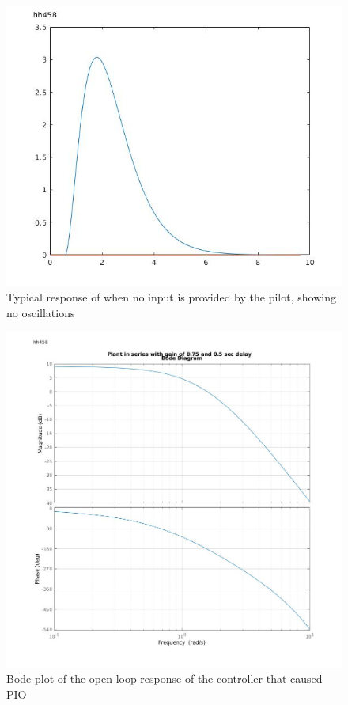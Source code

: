 \documentclass[twoside,twocolumn]{article}
\begin{document}
 \begin{figure}[h]
  \centering
    \includegraphics[width=\linewidth]{2-1_zero_input}
  \caption{Typical response of when no input is provided by the pilot, showing no oscillations}
  \label{fig:2-1zero}
\end{figure}

\begin{figure}[h]
  \centering
    \includegraphics[width=\linewidth]{2-1_bode}
  \caption{Bode plot of the open loop response of the controller that caused PIO}
  \label{fig:2-1bode}
\end{figure}
\end{document}
